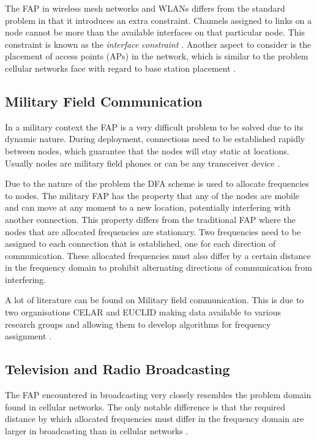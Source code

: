The \gls{FAP} in wireless mesh networks and WLANs differs from the standard problem in that it introduces an extra constraint. Channels assigned to links on a node cannot be more than the available interfaces on that particular node. This constraint is known as the \emph{interface constraint} \cite{MultiradioMeshNetworks}. Another aspect to consider is the placement of access points (APs) in the network, which is similar to the problem cellular networks face with regard to base station placement \cite{Karen2004}.

\subsection{Military Field Communication}
In a military context the \gls{FAP} is a very difficult problem to be solved due to its dynamic nature\cite{CALMA}. During deployment, connections need to be established rapidly between nodes, which guarantee that the nodes will stay static at locations. Usually nodes are military field phones or can be any transceiver device \cite{CALMA,DynamicFAP}. 

Due to the nature of the problem the \gls{DFA} scheme is used to allocate frequencies to nodes. The military \gls{FAP} has the property that any of the nodes are mobile and can move at any moment to a new location, potentially interfering with another connection\cite{CALMA,DynamicFAP}. This property differs from the traditional \gls{FAP} where the nodes that are allocated frequencies are stationary\cite{CALMA}. Two frequencies need to be assigned to each connection that is established, one for each direction of communication. These allocated frequencies must also differ by a certain distance in the frequency domain to prohibit alternating directions of communication from interfering\cite{CALMA,DynamicFAP}.

A lot of literature can be found on Military field communication. This is due to two organisations CELAR and \gls{EUCLID} making data available to various research groups and allowing them to develop algorithms for frequency assignment \cite{CALMA,DynamicFAP}. 

\subsection{Television and Radio Broadcasting}
The \gls{FAP} encountered in broadcasting very closely resembles the problem domain found in cellular networks\cite{Karen2004}. The only notable difference is that the required distance by which allocated frequencies must differ in the frequency domain are larger in broadcasting than in cellular networks \cite{Karen2004}.

